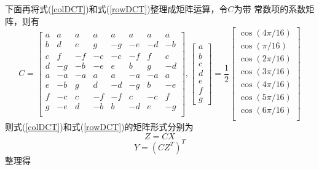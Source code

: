 \documentclass{article}
\numberwithin {equation}{section}
\begin{document}
\begin{spacing}{1.25}
        下面再将式(\ref{colDCT})和式(\ref{rowDCT})整理成矩阵运算，令$C$为带
        常数项的系数矩阵，则有
        \begin{equation}
          C=\begin{bmatrix}
            a & a   & a   & a   & a   & a   & a   & a\\
            b & d   & e   & g   & -g  & -e  & -d  & -b\\
            c & f   & -f  & -c  & -c  & -f  & f   & c\\
            d & -g  & -b  & -e  & e   & b   & g   & -d\\
            a & -a  & -a  & a   & a   & -a  & -a  & a\\
            e & -b  & g   & d   & -d  & -g  & b   & -e\\
            f & -c  & c   & -f  & -f  & c   & -c  & f\\
            g & -e  & d   & -b  & b   & -d  & e   & -g\\
          \end{bmatrix},
          \begin{bmatrix}
            a \\ b \\ c \\ d \\ e \\ f \\ g
          \end{bmatrix}=
          \frac{1}{2}\begin{bmatrix}
            \cos(4\pi/16)\\
            \cos(\pi/16)\\
            \cos(2\pi/16)\\
            \cos(3\pi/16)\\
            \cos(4\pi/16)\\
            \cos(5\pi/16)\\
            \cos(6\pi/16)\\
          \end{bmatrix}
          \label{C}
        \end{equation}
        则式(\ref{colDCT})和式(\ref{rowDCT})的矩阵形式分别为
        \begin{equation}
          Z=CX 
          \label{col}
        \end{equation}
        \begin{equation}
          Y=(CZ^{T})^{T}
        \end{equation}
        整理得
        \begin{equation}

\end{equation}
\end{spacing}
\end{document}
